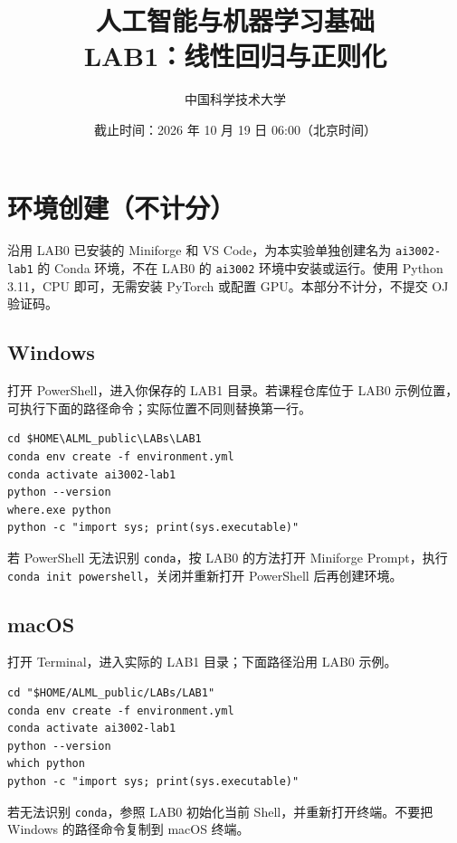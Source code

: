 \documentclass[11pt,a4paper]{article}
\title{\vspace{-0.8cm}\textbf{人工智能与机器学习基础\\LAB1：线性回归与正则化}}
\author{中国科学技术大学}
\date{截止时间：2026 年 10 月 19 日 06:00（北京时间）}
\newcommand{\code}[1]{{\small\nolinkurl{#1}}}
\begin{document}
\maketitle
\thispagestyle{fancy}
\setcounter{section}{-1}

\section*{环境创建（不计分）}
沿用 LAB0 已安装的 Miniforge 和 VS Code，为本实验单独创建名为 \code{ai3002-lab1} 的 Conda 环境，不在 LAB0 的 \code{ai3002} 环境中安装或运行。使用 Python 3.11，CPU 即可，无需安装 PyTorch 或配置 GPU。本部分不计分，不提交 OJ 验证码。


\subsection*{Windows}
打开 PowerShell，进入你保存的 LAB1 目录。若课程仓库位于 LAB0 示例位置，可执行下面的路径命令；实际位置不同则替换第一行。


\par{}\noindent\begin{minipage}{\linewidth}
\begin{lstlisting}[aboveskip=0pt,belowskip=0pt]
cd $HOME\ALML_public\LABs\LAB1
conda env create -f environment.yml
conda activate ai3002-lab1
python --version
where.exe python
python -c "import sys; print(sys.executable)"
\end{lstlisting}
\end{minipage}\par{}
若 PowerShell 无法识别 \code{conda}，按 LAB0 的方法打开 Miniforge Prompt，执行 {\small\texttt{conda init powershell}}，关闭并重新打开 PowerShell 后再创建环境。


\subsection*{macOS}
打开 Terminal，进入实际的 LAB1 目录；下面路径沿用 LAB0 示例。


\par{}\noindent\begin{minipage}{\linewidth}
\begin{lstlisting}[aboveskip=0pt,belowskip=0pt]
cd "$HOME/ALML_public/LABs/LAB1"
conda env create -f environment.yml
conda activate ai3002-lab1
python --version
which python
python -c "import sys; print(sys.executable)"
\end{lstlisting}
\end{minipage}\par{}
若无法识别 \code{conda}，参照 LAB0 初始化当前 Shell，并重新打开终端。不要把 Windows 的路径命令复制到 macOS 终端。
\end{document}
